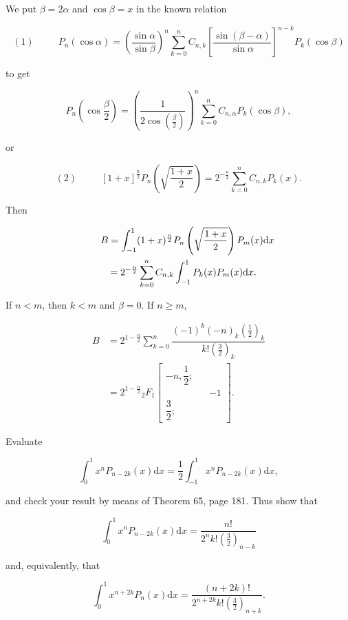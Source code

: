 \begin{solution}
We put $\beta= 2 \alpha$ and $\cos \beta = x$ in the known relation

$$(1) \hspace{30pt} P_n(\cos \alpha) = \left( \dfrac{\sin \alpha}{\sin \beta} \right)^n \displaystyle\sum_{k=0}^n C_{n,k} \left[ \dfrac{\sin(\beta - \alpha)}{\sin \alpha} \right]^{n-k} P_k(\cos \beta)$$

to get

$$P_n \left(\cos \dfrac{\beta}{2} \right) = \left( \dfrac{1}{2 \cos(\frac{\beta}{2})} \right)^n \displaystyle\sum_{k=0}^n C_{n, \alpha} P_k(\cos \beta),$$

or

$$(2) \hspace{30pt} [1+x]^{\frac{n}{2}} P_n \left( \sqrt{ \dfrac{1+x}{2} } \right) = 2^{-\frac{n}{2}} \displaystyle\sum_{k=0}^n C_{n,k} P_k(x).$$

Then

\begin{eqnarray*}
\lefteqn{B = \displaystyle\int_{-1}^1 (1+x)^{\frac{n}{2}} P_n \left( \sqrt{ \dfrac{1+x}{2} } \right) P_m(x) \mathrm{d}x} \\
&& = 2^{-\frac{n}{2}} \displaystyle\sum_{k=0}^n C_{n,k} \displaystyle\int_{-1}^1 P_k(x) P_m(x) \mathrm{d}x.
\end{eqnarray*}

If $n < m$, then $k < m$ and $\beta = 0$. If $n \geq m$,

$$\begin{array}{ll}
B &= 2^{1 - \frac{n}{2}} \displaystyle\sum_{k=0}^n \dfrac{(-1)^k (-n)_k (\frac{1}{2})_k}{k! (\frac{3}{2})_k} \\
&= 2^{1 - \frac{n}{2}} {}_2F_1 \left[ \begin{array}{rlr}
-n, \dfrac{1}{2}; & & \\
& & -1 \\
\dfrac{3}{2}; & & 
\end{array} \right].
\end{array}$$
\end{solution}
\begin{problem}\label{problem12chapter10}
Evaluate 

$$\displaystyle\int_0^1 x^n P_{n-2k}(x)\mathrm{d}x = \dfrac{1}{2} \displaystyle\int_{-1}^1 x^n P_{n-2k}(x) \mathrm{d}x,$$

and check your result by means of Theorem 65, page 181. Thus show that

$$\displaystyle\int_0^1 x^n P_{n-2k}(x) \mathrm{d}x = \dfrac{n!}{2^n k! (\frac{3}{2})_{n-k}}$$

and, equivalently, that

$$\displaystyle\int_0^1 x^{n+2k}P_n(x) \mathrm{d}x = \dfrac{(n+2k)!}{2^{n+2k}k!(\frac{3}{2})_{n+k}}.$$
\end{problem}
